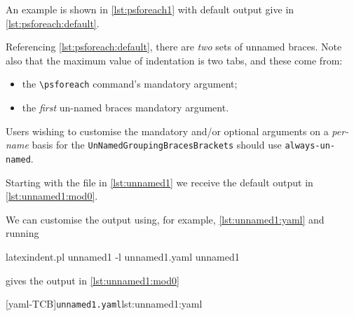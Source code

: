   \begin{example}
  An example is shown in \cref{lst:psforeach1} with default output give in
  \cref{lst:psforeach:default}.

  \begin{cmhtcbraster}
  \end{cmhtcbraster}

  Referencing \cref{lst:psforeach:default}, there are \emph{two} sets of unnamed braces.
  Note also that the maximum value of indentation is two tabs, and these come from:
  \begin{itemize}
   \item the \lstinline!\psforeach! command's mandatory argument;
   \item the \emph{first} un-named braces mandatory argument.
  \end{itemize}
  \end{example}

  Users wishing to customise the mandatory and/or optional arguments on a \emph{per-name}
  basis for the \texttt{UnNamedGroupingBracesBrackets} should use
  \texttt{always-un-named}.

  \begin{example}
  Starting with the file in \cref{lst:unnamed1} we receive the default output in
  \cref{lst:unnamed1:mod0}.

  \begin{cmhtcbraster}
  \end{cmhtcbraster}

  We can customise the output using, for example, \cref{lst:unnamed1:yaml} and running

  \begin{commandshell}
latexindent.pl unnamed1 -l unnamed1.yaml unnamed1
         \end{commandshell}

  gives the output in \cref{lst:unnamed1:mod0}

  \begin{cmhtcbraster}
   [yaml-TCB]{\texttt{unnamed1.yaml}}{lst:unnamed1:yaml}
  \end{cmhtcbraster}
  \end{example}

